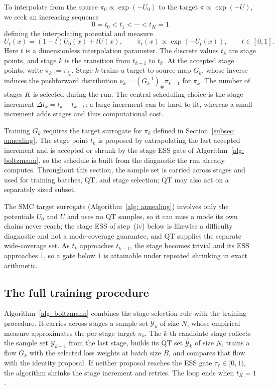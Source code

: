 \documentclass{article}
\begin{document}
To interpolate from the source $\pi_0 \propto \exp(-U_0)$ to the target $\pi \propto \exp(-U)$, we seek an increasing sequence
\begin{equation*}
    0 = t_0 < t_1 < \cdots < t_K = 1
\end{equation*}
defining the interpolating potential and measure
\begin{equation*}
    U_t(x)=(1-t)U_0(x)+tU(x),
\qquad \pi_t(x)\propto\exp(-U_t(x)),
    \qquad t\in[0,1].
\end{equation*}
Here $t$ is a dimensionless interpolation parameter. The discrete values $t_k$ are stage points, and stage $k$ is the transition from $t_{k-1}$ to $t_k$. At the accepted stage points, write $\pi_k:=\pi_{t_k}$. Stage $k$ trains a target-to-source map $G_k$, whose inverse induces the pushforward distribution $\nu_k=(G_k^{-1})_{\#}\pi_{k-1}$ for $\pi_k$. The number of stages $K$ is selected during the run. The central scheduling choice is the stage increment $\Delta t_k=t_k-t_{k-1}$: a large increment can be hard to fit, whereas a small increment adds stages and thus computational cost.

Training $G_k$ requires the target surrogate for $\pi_k$ defined in Section~\ref{subsec: annealing}. The stage point $t_k$ is proposed by extrapolating the last accepted increment and is accepted or shrunk by the stage ESS gate of Algorithm~\ref{alg: boltzmann}, so the schedule is built from the diagnostic the run already computes. Throughout this section, the sample set is carried across stages and used for training batches, QT, and stage selection; QT may also act on a separately sized subset.

The SMC target surrogate (Algorithm~\ref{alg: annealing}) involves only the potentials $U_0$ and $U$ and uses no QT samples, so it can miss a mode its own chains never reach; the stage ESS of step~(iv) below is likewise a difficulty diagnostic and not a mode-coverage guarantee, and QT supplies the separate wide-coverage set. As $t_k$ approaches $t_{k-1}$, the stage becomes trivial and its ESS approaches $1$, so a gate below $1$ is attainable under repeated shrinking in exact arithmetic.


\subsection{The full training procedure}

Algorithm~\ref{alg: boltzmann} combines the stage-selection rule with the training procedure. It carries across stages a sample set $\mathcal Y_k$ of size $N$, whose empirical measure approximates the per-stage target $\pi_k$. The $k$-th candidate stage collects the sample set $\mathcal Y_{k-1}$ from the last stage, builds its QT set $\hat{\mathcal Y}_k$ of size $N$, trains a flow $G_k$ with the selected loss weights at batch size $B$, and compares that flow with the identity proposal. If neither proposal reaches the ESS gate $\tau_{\mathrm v}\in[0,1)$, the algorithm shrinks the stage increment and retries. The loop ends when $t_K=1$.
\end{document}
